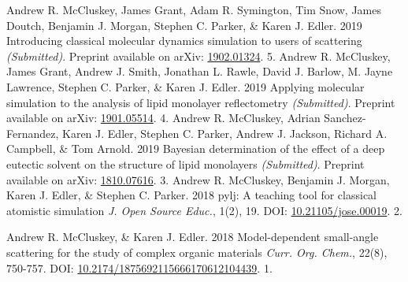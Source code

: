 \begin{cvpubys}
  \cvpuby
    {Andrew R. McCluskey, James Grant, Adam R. Symington, Tim Snow, James Doutch, Benjamin J. Morgan, Stephen C. Parker, \& Karen J. Edler.}
    {2019}
    {Introducing classical molecular dynamics simulation to users of scattering}
    {\emph{(Submitted)}. Preprint available on arXiv: \href{https://arxiv.org/abs/1902.01324}{1902.01324}.}
    {5.}
  \cvpuby
    {Andrew R. McCluskey, James Grant, Andrew J. Smith, Jonathan L. Rawle, David J. Barlow, M. Jayne Lawrence, Stephen C. Parker, \& Karen J. Edler.}
    {2019}
    {Applying molecular simulation to the analysis of lipid monolayer reflectometry}
    {\emph{(Submitted)}. Preprint available on arXiv: \href{https://arxiv.org/abs/1901.05514}{1901.05514}.}
    {4.}
  \cvpuby
    {Andrew R. McCluskey, Adrian Sanchez-Fernandez, Karen J. Edler, Stephen C. Parker, Andrew J. Jackson, Richard A. Campbell, \& Tom Arnold.}
    {2019}
    {Bayesian determination of the effect of a deep eutectic solvent on the structure of lipid monolayers}
    {\emph{(Submitted)}. Preprint available on arXiv: \href{https://arxiv.org/abs/1810.07616}{1810.07616}.}
    {3.}
  \cvpuby
    {Andrew R. McCluskey, Benjamin J. Morgan, Karen J. Edler, \& Stephen C. Parker.}
    {2018}
    {pylj: A teaching tool for classical atomistic simulation}
    {\emph{J. Open Source Educ.}, 1(2), 19. DOI: \href{http://doi.org/10.21105/jose.00019}{10.21105/jose.00019}.}
    {2.}
  \end{cvpubys}
  \begin{cvpubys}
  \cvpuby
    {Andrew R. McCluskey, \& Karen J. Edler.}
    {2018}
    {Model-dependent small-angle scattering for the study of complex organic materials}
    {\emph{Curr. Org. Chem.}, 22(8), 750-757. DOI: \href{http://doi.org/10.2174/1875692115666170612104439}{10.2174/1875692115666170612104439}.}
    {1.}
\end{cvpubys}
